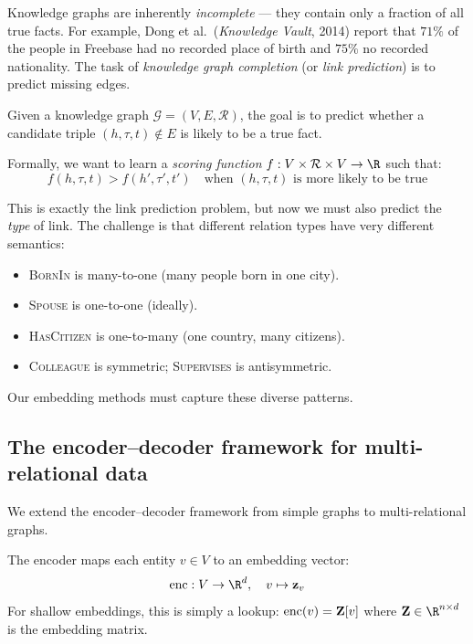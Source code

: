 \begin{notechapter}
\begin{intuition}[Motivation]
Knowledge graphs are inherently \emph{incomplete} --- they contain only a fraction of all true facts. For example, Dong et al.\ (\emph{Knowledge Vault}, 2014) report that $71\%$ of the people in Freebase had no recorded place of birth and $75\%$ no recorded nationality. The task of \emph{knowledge graph completion} (or \emph{link prediction}) is to predict missing edges.
\end{intuition}

\begin{definition}
Given a knowledge graph $\mathcal{G} = (V, E, \mathcal{R})$, the goal is to predict whether a candidate triple $(h, \tau, t) \notin E$ is likely to be a true fact.

Formally, we want to learn a \emph{scoring function} $f: V \times \mathcal{R} \times V \to \R$ such that:
\[
f(h, \tau, t) > f(h', \tau', t') \quad \text{when } (h, \tau, t) \text{ is more likely to be true}
\]
\end{definition}

\begin{intuition}
This is exactly the link prediction problem, but now we must also predict the \emph{type} of link. The challenge is that different relation types have very different semantics:
\begin{itemize}
    \item \textsc{BornIn} is many-to-one (many people born in one city).
    \item \textsc{Spouse} is one-to-one (ideally).
    \item \textsc{HasCitizen} is one-to-many (one country, many citizens).
    \item \textsc{Colleague} is symmetric; \textsc{Supervises} is antisymmetric.
\end{itemize}
Our embedding methods must capture these diverse patterns.
\end{intuition}

\subsection{The encoder--decoder framework for multi-relational data}

We extend the encoder--decoder framework from simple graphs to multi-relational graphs.

\begin{definition}
The encoder maps each entity $v \in V$ to an embedding vector:
\[
\text{enc}: V \to \R^d, \quad v \mapsto \vect{z}_v
\]
For shallow embeddings, this is simply a lookup: $\text{enc}(v) = \mathbf{Z}[v]$ where $\vect{Z} \in \R^{n \times d}$ is the embedding matrix.


\end{definition}
\end{notechapter}
